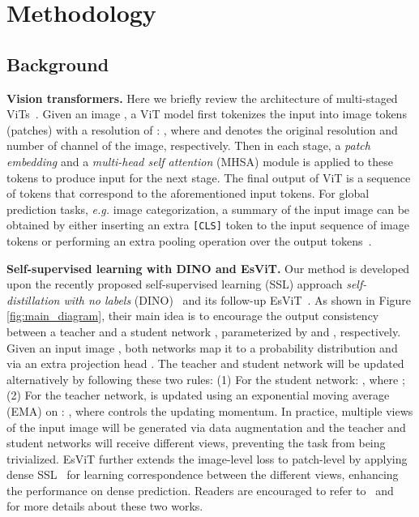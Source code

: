 \documentclass{article} \usepackage{iclr2022_conference,times}
\renewcommand{\paragraph}[1]{\noindent\textbf{#1.}}
\begin{document}
\vspace{-10pt}
\section{Methodology} 
\label{sec:method}
\vspace{-8pt}
\subsection{Background}
\vspace{-5pt}
\label{sec:overview}
\paragraph{Vision transformers} 
Here we briefly review the architecture of multi-staged ViTs~\citep{vit}. Given an image , a ViT model  first tokenizes the input into  image tokens (patches) with a resolution of : , where  and  denotes the original resolution and number of channel of the image, respectively. Then in each stage, a \emph{patch embedding} and a \emph{multi-head self attention} (MHSA) module is applied to these tokens to produce input for the next stage. 
The final output of ViT  is a sequence of tokens  that correspond to the aforementioned input tokens. 
For global prediction tasks, \emph{e.g.} image categorization, a summary of the input image can be obtained by either inserting an extra \texttt{[CLS]} token to the input sequence of image tokens or performing an extra pooling operation over the output tokens~\citep{zhai2021scaling}. 




\paragraph{Self-supervised learning with DINO and EsViT} 
Our method is developed upon the recently proposed self-supervised learning (SSL) approach \textit{self-distillation with no labels} (DINO)~\citep{dino} and its follow-up EsViT~\citep{esvit}. As shown in Figure \ref{fig:main_diagram}, their main idea is to encourage the output consistency between a teacher  and a student network , parameterized by  and , respectively. Given an input image , both networks map it to a probability distribution  and  via an extra projection head . The teacher and student network will be updated alternatively by following these two rules: (1) For the student network: , where ; (2) For the teacher network,  is updated using an exponential moving average (EMA)
on : , where  controls the updating momentum. In practice, multiple views of the input image  will be generated via data augmentation and the teacher and student networks will receive different views, preventing the task from being trivialized. EsViT further extends the image-level loss  to patch-level by applying dense SSL~\citep{densecl} for learning correspondence between the different views, enhancing the performance on dense prediction. Readers are encouraged to refer to~\cite{dino} and~\cite{esvit} for more details about these two works.
\end{document}
